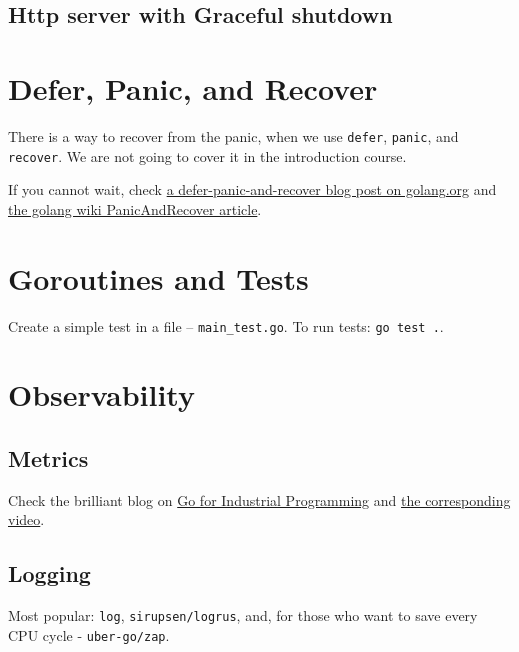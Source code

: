 \documentclass[11pt, letterpaper]{article}
\begin{document}
\subsection{Http server with Graceful shutdown}



\section{Defer, Panic, and Recover}

There is a way to recover from the panic, when we use \verb|defer|, \verb|panic|, and \verb|recover|. We are not going to cover it in the introduction course.

If you cannot wait, check \href{https://blog.golang.org/defer-panic-and-recover}{a defer-panic-and-recover blog post on golang.org} and \href{https://github.com/golang/go/wiki/PanicAndRecover}{the golang wiki PanicAndRecover article}.

\section{Goroutines and Tests}

Create a simple test in a file -- \verb|main_test.go|. To run tests: \verb|go test .|.


\section{Observability}

\subsection{Metrics}

Check the brilliant blog on \href{https://peter.bourgon.org/go-for-industrial-programming/}{Go for Industrial Programming} and \href{https://www.youtube.com/watch?v=PTE4VJIdHPg}{the corresponding video}.

\subsection{Logging}

Most popular: \verb|log|, \verb|sirupsen/logrus|, and, for those who want to save every CPU cycle - \verb|uber-go/zap|.
\end{document}
